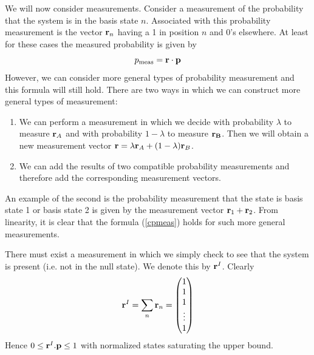 \documentclass[12pt]{article}
\begin{document}
We will now consider measurements.
Consider a measurement of the probability that the system is in the
basis state $n$.  Associated with this probability measurement is the
vector ${\bf r}_n$ having a 1 in position $n$ and 0's elsewhere. At
least for these cases the measured probability is given by
\begin{equation}\label{cpmeas}
p_{\rm meas} = {\bf r}\cdot{\bf p}
\end{equation}
However, we can consider more general types of probability measurement and
this formula will still hold. There are two ways in which we can
construct more general types of measurement:
\begin{enumerate}
\item We can perform a measurement in which we decide with probability
$\lambda$ to measure ${\bf r}_A$ and with probability $1-\lambda$ to
measure ${\bf r_B}$.  Then we will obtain a new measurement vector ${\bf
r}=\lambda {\bf r}_A +(1-\lambda) {\bf r}_B $.
\item We can add the results of two compatible probability measurements
and therefore add the corresponding measurement vectors.
\end{enumerate}
An example of the second is the probability measurement that the state
is basis state 1 or basis state 2 is given by the measurement vector
${\bf r}_1+{\bf r}_2$. From linearity, it is clear that the formula
(\ref{cpmeas}) holds for such more general measurements.

There must exist a measurement in which we simply check to see that the
system is present (i.e. not in the null state).  We denote this by ${\bf
r}^I$.  Clearly
\begin{equation}
{\bf r}^I=\sum_n {\bf r}_n =\left( \begin{matrix} 1 \\ 1 \\ 1 \\ \vdots
\\ 1 \end{matrix} \right)
\end{equation}
Hence $0\leq {\bf r}^I.{\bf p} \leq 1$ with normalized states saturating
the upper bound.
\end{document}
